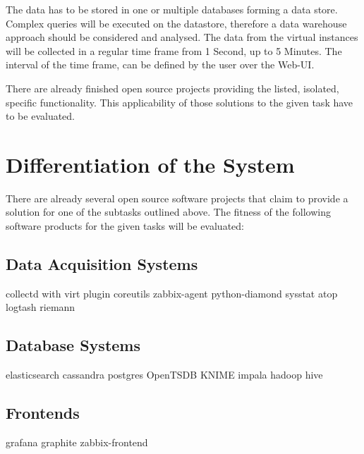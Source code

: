 The data has to be stored in one or multiple databases forming a data store.
Complex queries will be executed on the datastore, therefore a data warehouse
approach should be considered and analysed. The data from the virtual instances
will be collected in a regular time frame from 1 Second, up to 5 Minutes. The
interval of the time frame, can be defined by the user over the Web-UI.

There are already finished open source projects providing the listed, isolated,
specific functionality. This applicability of those solutions to the given task
have to be evaluated.

\section{Differentiation of the System}

There are already several open source software projects that claim to provide a
solution for one of the subtasks outlined above. The fitness of the following
software products for the given tasks will be evaluated:

\subsection{Data Acquisition Systems}

\begin{outline}
    \1 collectd with virt plugin
    \1 coreutils
    \1 zabbix-agent
    \1 python-diamond
    \1 sysstat
    \1 atop
    \1 logtash
    \1 riemann
\end{outline}

\subsection{Database Systems}

\begin{outline}
    \1 elasticsearch
    \1 cassandra
    \1 postgres
    \1 OpenTSDB
    \1 KNIME
    \1 impala
    \1 hadoop
    \1 hive
\end{outline}

\subsection{Frontends}

\begin{outline}
    \1 grafana
    \1 graphite
    \1 zabbix-frontend
\end{outline}

